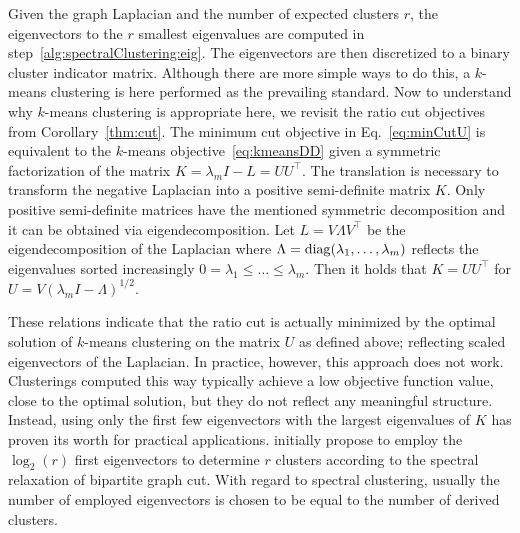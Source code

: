 Given the graph Laplacian and the number of expected clusters $r$, the eigenvectors to the $r$ smallest eigenvalues are computed in step~\ref{alg:spectralClustering:eig}. The eigenvectors are then discretized to a binary cluster indicator matrix. Although there are more simple ways to do this, a $k$-means clustering is here performed as the prevailing standard. 
Now to understand why $k$-means clustering is appropriate here, we revisit the ratio cut objectives from Corollary~\ref{thm:cut}. The minimum cut objective in Eq.~\eqref{eq:minCutU} is equivalent to the $k$-means objective~\eqref{eq:kmeansDD} given a symmetric factorization of the matrix $K=\lambda_mI-L=UU^\top$. The translation is necessary to transform the negative Laplacian into a positive semi-definite matrix $K$. Only positive semi-definite matrices have the mentioned symmetric decomposition and it can be obtained via eigendecomposition. Let $L=V\Lambda V^\top$ be the eigendecomposition of the Laplacian where $\Lambda=\operatorname{diag}(\lambda_1,\ldots ,\lambda_m)$ reflects the eigenvalues sorted increasingly $0=\lambda_1\leq \ldots\leq \lambda_m$. Then it holds that $K=UU^\top$ for $U=V(\lambda_mI-\Lambda)^{1/2}$.

These relations indicate that the ratio cut is actually minimized by the optimal solution of $k$-means clustering on the matrix $U$ as defined above; reflecting scaled eigenvectors of the Laplacian. In practice, however, this approach does not work. Clusterings computed this way typically achieve a low objective function value, close to the optimal solution, but they do not reflect any meaningful structure. Instead, using only the first few eigenvectors with the largest eigenvalues of $K$ has proven its worth for practical applications. \cite{dhillon2001co} initially propose to employ the $\log_2(r)$ first eigenvectors to determine $r$ clusters according to the spectral relaxation of bipartite graph cut. With regard to spectral clustering, usually the number of employed eigenvectors is chosen to be equal to the number of derived clusters.  


